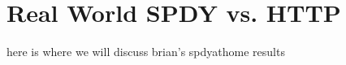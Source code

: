 \documentclass[11pt,letterpaper,notitlepage]{article}
\begin{document}
\section{Real World SPDY vs. HTTP}
\label{sec:realworld}
here is where we will discuss brian's spdyathome results


%



\end{document}
